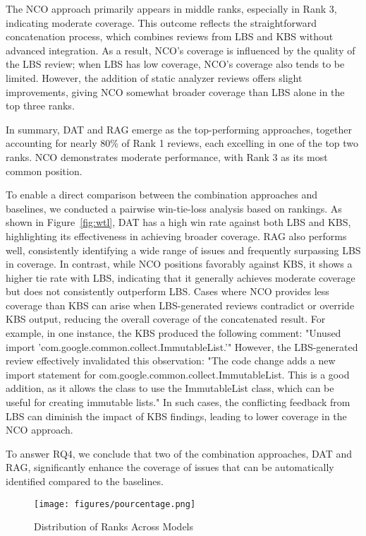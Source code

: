 The NCO approach primarily appears in middle ranks, especially in Rank 3, indicating moderate coverage. This outcome reflects the straightforward concatenation process, which combines reviews from LBS and KBS without advanced integration. As a result, NCO's coverage is influenced by the quality of the LBS review; when LBS has low coverage, NCO’s coverage also tends to be limited. However, the addition of static analyzer reviews offers slight improvements, giving NCO somewhat broader coverage than LBS alone in the top three ranks.

In summary, DAT and RAG emerge as the top-performing approaches, together accounting for nearly 80\% of Rank 1 reviews, each excelling in one of the top two ranks. NCO demonstrates moderate performance, with Rank 3 as its most common position.

To enable a direct comparison between the combination approaches and baselines, we conducted a pairwise win-tie-loss analysis based on rankings. As shown in Figure~\ref{fig:wtl}, DAT has a high win rate against both LBS and KBS, highlighting its effectiveness in achieving broader coverage. RAG also performs well, consistently identifying a wide range of issues and frequently surpassing LBS in coverage. In contrast, while NCO positions favorably against KBS, it shows a higher tie rate with LBS, indicating that it generally achieves moderate coverage but does not consistently outperform LBS. Cases where NCO provides less coverage than KBS can arise when LBS-generated reviews contradict or override KBS output, reducing the overall coverage of the concatenated result. For example, in one instance, the KBS produced the following comment:
"Unused import 'com.google.common.collect.ImmutableList.'"
However, the LBS-generated review effectively invalidated this observation:
"The code change adds a new import statement for com.google.common.collect.ImmutableList. This is a good addition, as it allows the class to use the ImmutableList class, which can be useful for creating immutable lists."
In such cases, the conflicting feedback from LBS can diminish the impact of KBS findings, leading to lower coverage in the NCO approach.


To answer RQ4, we conclude that two of the combination approaches, DAT and RAG, significantly enhance the coverage of issues that can be automatically identified compared to the baselines.


\begin{figure}[htbp!]
  \centering
  \texttt{[image: figures/pourcentage.png]}
  \caption{Distribution of Ranks Across Models}
  \label{fig:rating_results} 
\end{figure}



